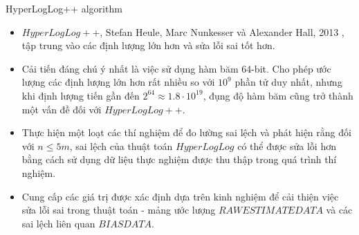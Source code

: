\documentclass[10pt]{beamer}
\begin{document}
\begin{frame}{HyperLogLog++ algorithm}
  \begin{itemize}
    \item $HyperLogLog++$, Stefan Heule, Marc Nunkesser và Alexander Hall, 2013 \cite{chabchoub2010sliding}, tập trung vào 
    các định lượng lớn hơn và sửa lỗi sai tốt hơn.
    \item Cải tiến đáng chú ý nhất là việc sử dụng hàm băm 64-bit. Cho phép 
    ước lượng các định lượng lớn hơn rất nhiều so với $10^9$ phần tử duy nhất, 
    nhưng khi định lượng tiến gần đến $2^{64} \approx 1.8\cdot 10^{19}$, 
    đụng độ hàm băm cũng trở thành một vấn đề đối với $HyperLogLog++$.
    \item Thực hiện một loạt các thí nghiệm để đo lường 
    sai lệch và phát hiện rằng đối với $n \le 5m$, sai lệch của thuật toán $HyperLogLog$ 
    có thể được sửa lỗi hơn bằng cách sử dụng dữ liệu thực nghiệm được thu thập 
    trong quá trình thí nghiệm.
    \item Cung cấp các giá trị được xác định dựa trên kinh nghiệm 
    để cải thiện việc sửa lỗi sai trong thuật toán - mảng ước lượng $RAWESTIMATEDATA$ và 
    các sai lệch liên quan $BIASDATA$.
  \end{itemize}
  
  
  

\end{frame}
\end{document}
